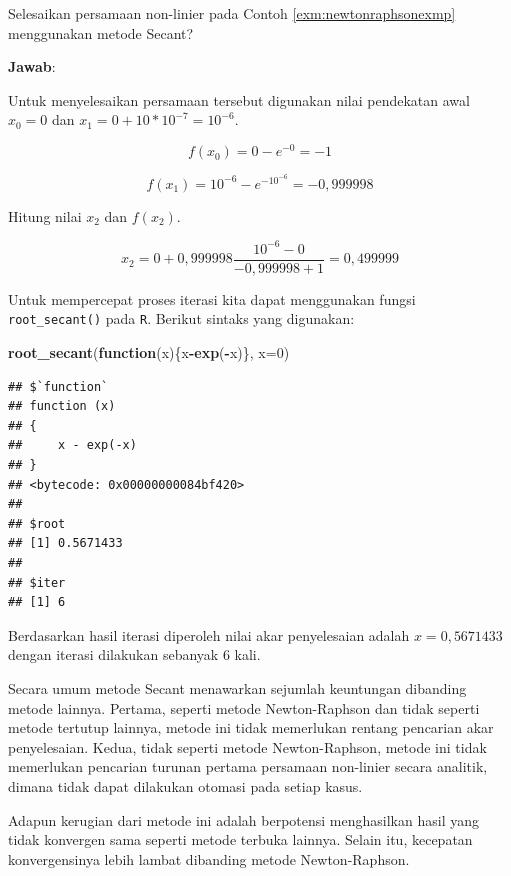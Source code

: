 \documentclass[]{book}
\newenvironment{Shaded}{\begin{snugshade}}{\end{snugshade}}
\newcommand{\ControlFlowTok}[1]{\textcolor[rgb]{0.13,0.29,0.53}{\textbf{#1}}}
\newcommand{\DataTypeTok}[1]{\textcolor[rgb]{0.13,0.29,0.53}{#1}}
\newcommand{\DecValTok}[1]{\textcolor[rgb]{0.00,0.00,0.81}{#1}}
\newcommand{\KeywordTok}[1]{\textcolor[rgb]{0.13,0.29,0.53}{\textbf{#1}}}
\newcommand{\NormalTok}[1]{#1}
\newcommand{\OperatorTok}[1]{\textcolor[rgb]{0.81,0.36,0.00}{\textbf{#1}}}
\theoremstyle{definition}
\theoremstyle{definition}
\theoremstyle{definition}
\theoremstyle{remark}
\let\BeginKnitrBlock\begin \let\EndKnitrBlock\end
\begin{document}
\BeginKnitrBlock{example}
\protect\hypertarget{exm:secantexmp}{}{\label{exm:secantexmp} }Selesaikan persamaan non-linier pada Contoh \ref{exm:newtonraphsonexmp} menggunakan metode Secant?
\EndKnitrBlock{example}

\textbf{Jawab}:

Untuk menyelesaikan persamaan tersebut digunakan nilai pendekatan awal \(x_0=0\) dan \(x_1=0+10*10^{-7}=10^{-6}\).

\[
f\left(x_0 \right)=0-e^{-0}=-1
\]

\[
f\left(x_1 \right)=10^{-6}-e^{-10^{-6}}=-0,999998
\]

Hitung nilai \(x_2\) dan \(f\left(x_2 \right)\).

\[
x_2=0+0,999998\frac{10^{-6}-0}{-0,999998+1}=0,499999
\]

Untuk mempercepat proses iterasi kita dapat menggunakan fungsi \texttt{root\_secant()} pada \texttt{R}. Berikut sintaks yang digunakan:

\begin{Shaded}
\begin{Highlighting}[]
\KeywordTok{root_secant}\NormalTok{(}\ControlFlowTok{function}\NormalTok{(x)\{x}\OperatorTok{-}\KeywordTok{exp}\NormalTok{(}\OperatorTok{-}\NormalTok{x)\}, }\DataTypeTok{x=}\DecValTok{0}\NormalTok{)}
\end{Highlighting}
\end{Shaded}

\begin{verbatim}
## $`function`
## function (x) 
## {
##     x - exp(-x)
## }
## <bytecode: 0x00000000084bf420>
## 
## $root
## [1] 0.5671433
## 
## $iter
## [1] 6
\end{verbatim}

Berdasarkan hasil iterasi diperoleh nilai akar penyelesaian adalah \(x=0,5671433\) dengan iterasi dilakukan sebanyak \(6\) kali.

Secara umum metode Secant menawarkan sejumlah keuntungan dibanding metode lainnya. Pertama, seperti metode Newton-Raphson dan tidak seperti metode tertutup lainnya, metode ini tidak memerlukan rentang pencarian akar penyelesaian. Kedua, tidak seperti metode Newton-Raphson, metode ini tidak memerlukan pencarian turunan pertama persamaan non-linier secara analitik, dimana tidak dapat dilakukan otomasi pada setiap kasus.

Adapun kerugian dari metode ini adalah berpotensi menghasilkan hasil yang tidak konvergen sama seperti metode terbuka lainnya. Selain itu, kecepatan konvergensinya lebih lambat dibanding metode Newton-Raphson.
\end{document}
